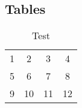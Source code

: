 \documentclass{amsart}
\theoremstyle{definition}%
\theoremstyle{definition}%
\begin{document}
\subsection{Tables}
\label{ss:tables}
\lipsum[1][1-3]
%
%
\begin{table}
\caption{Test}
\label{tab1}
\begin{tabular}{cccc}
1&2&3&4\\
5&6&7&8\\
9&10&11&12
\end{tabular}
\end{table}
%
%
%
% 
\begin{bibdiv}
\begin{biblist}
%
%
\end{biblist}
\end{bibdiv}
%
%
\end{document}
